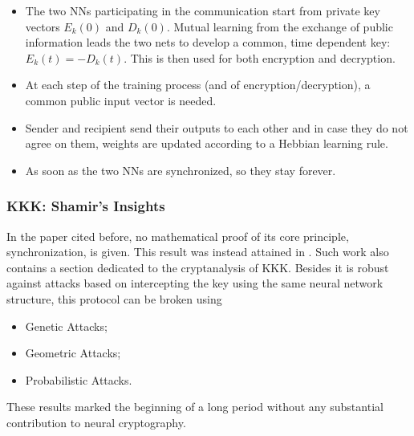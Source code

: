 \documentclass{beamer}
\begin{document}
\begin{frame}
\begin{itemize}
\item The two NNs participating in the communication start from private key vectors $E_k(0)$ and $D_k(0)$. Mutual learning from the exchange of public information leads the two nets to develop a common, time dependent key: $E_k(t) = - D_k(t)$. This is then used for both encryption and decryption.
\item At each step of the training process (and of encryption/decryption), a common public input vector is needed. 
\item Sender and recipient send their outputs to each other and in case they do not agree on them, weights are updated according
to a Hebbian learning rule.
\item As soon as the two NNs are synchronized, so they stay forever.
\end{itemize}
\end{frame}

\begin{frame}
\frametitle{KKK: Shamir's Insights}
In the paper cited before, no mathematical proof of its core principle, synchronization, is given. This result was instead attained in \cite{shamir}. Such work also contains a section dedicated to the cryptanalysis of KKK. Besides it is robust against attacks based on intercepting the key using the same neural network structure, this protocol can be broken using
\begin{itemize}
\item Genetic Attacks;
\item Geometric Attacks;
\item Probabilistic Attacks.
\end{itemize}
These results marked the beginning of a long period without any substantial contribution to neural cryptography.
\end{frame}






\end{document}
